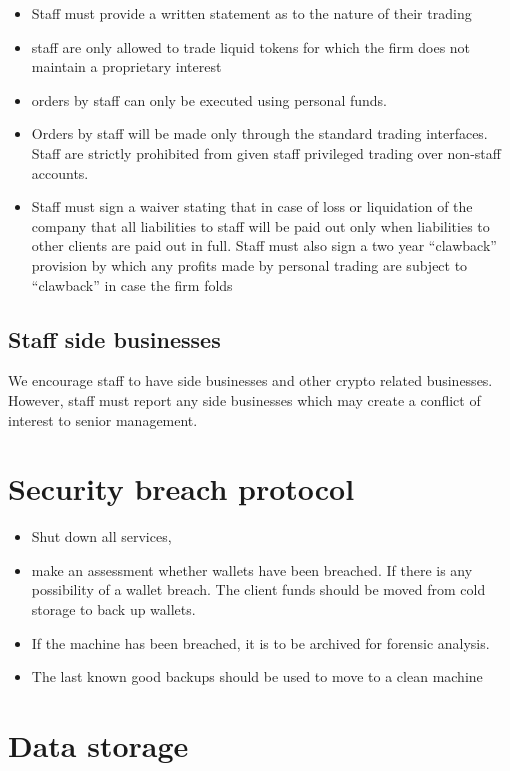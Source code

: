 \begin{itemize}
 \item Staff must provide a written statement as to the nature of
   their trading
  \item staff are only allowed to trade liquid tokens for which the
    firm does not maintain a proprietary interest
  \item orders by staff can only be executed using personal funds.
  \item Orders by staff will be made only through the standard trading
    interfaces.  Staff are strictly prohibited from given staff
    privileged trading over non-staff accounts.
  \item Staff must sign a waiver stating that in case of loss or
    liquidation of the company that all liabilities to staff will be
    paid out only when liabilities to other clients are paid out in
    full.  Staff must also sign a two year ``clawback'' provision by
    which any profits made by personal trading are subject to
    ``clawback'' in case the firm folds
\end{itemize}

\subsection{Staff side businesses}
We encourage staff to have side businesses and other crypto related
businesses.  However, staff must report any side businesses which may
create a conflict of interest to senior management.

\section{Security breach protocol}

\begin{itemize}
\item Shut down all services,
  \item make an assessment whether wallets have been breached.  If
    there is any possibility of a wallet breach.  The client funds should be
    moved from cold storage to back up wallets.
\item If the machine has been breached, it is to be archived for
  forensic analysis.
\item The last known good backups should be used to
  move to a clean machine
  
\end{itemize}    

\section{Data storage}
